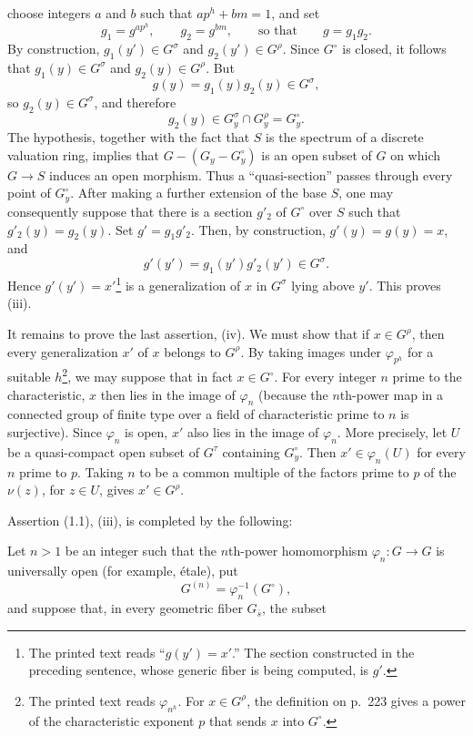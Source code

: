choose integers $a$ and $b$ such that $ap^h+bm=1$, and set
\[
g_1=g^{ap^h},\qquad g_2=g^{bm},\qquad\text{so that}\qquad g=g_1g_2.
\]
By construction, $g_1(y')\in G^\sigma$ and $g_2(y')\in G^\rho$. Since
$G^\circ$ is closed, it follows that $g_1(y)\in G^\sigma$ and
$g_2(y)\in G^\rho$. But
\[
g(y)=g_1(y)g_2(y)\in G^\sigma,
\]
so $g_2(y)\in G^\sigma$, and therefore
\[
g_2(y)\in G_y^\sigma\cap G_y^\rho=G_y^\circ.
\]
The hypothesis, together with the fact that $S$ is the spectrum of a discrete
valuation ring, implies that $G-(G_y-G_y^\circ)$ is an open subset of $G$ on
which $G\longrightarrow S$ induces an open morphism. Thus a “quasi-section”
passes through every point of $G_y^\circ$. After making a further extension of
the base $S$, one may consequently suppose that there is a section $g'_2$ of
$G^\circ$ over $S$ such that $g'_2(y)=g_2(y)$. Set $g'=g_1g'_2$. Then, by
construction, $g'(y)=g(y)=x$, and
\[
g'(y')=g_1(y')g'_2(y')\in G^\sigma.
\]
Hence $g'(y')=x'$\footnote{The printed text reads “$g(y')=x'$.” The section
constructed in the preceding sentence, whose generic fiber is being computed,
is $g'$.} is a generalization of $x$ in $G^\sigma$ lying above $y'$. This
proves (iii).

It remains to prove the last assertion, (iv). We must show that if
$x\in G^\rho$, then every generalization $x'$ of $x$ belongs to $G^\rho$. By
taking images under $\varphi_{p^h}$ for a suitable $h$\footnote{The printed
text reads $\varphi_{n^h}$. For $x\in G^\rho$, the definition on p.~223 gives
a power of the characteristic exponent $p$ that sends $x$ into $G^\circ$.},
we may suppose that in fact $x\in G^\circ$. For every integer $n$ prime to the
characteristic, $x$ then lies in the image of $\varphi_n$ (because the
$n$th-power map in a connected group of finite type over a field of
characteristic prime to $n$ is surjective). Since $\varphi_n$ is open, $x'$
also lies in the image of $\varphi_n$. More precisely, let $U$ be a
quasi-compact open subset of $G^\tau$ containing $G_y^\circ$. Then
$x'\in\varphi_n(U)$ for every $n$ prime to $p$. Taking $n$ to be a common
multiple of the factors prime to $p$ of the $\nu(z)$, for $z\in U$, gives
$x'\in G^\rho$.

Assertion (1.1), (iii), is completed by the following:

 Let $n>1$ be an integer such that the $n$th-power
homomorphism $\varphi_n:G\longrightarrow G$ is universally open (for example,
étale), put
\[
G^{(n)}=\varphi_n^{-1}(G^\circ),
\]
and suppose that, in every geometric fiber $G_{\bar s}$, the subset

